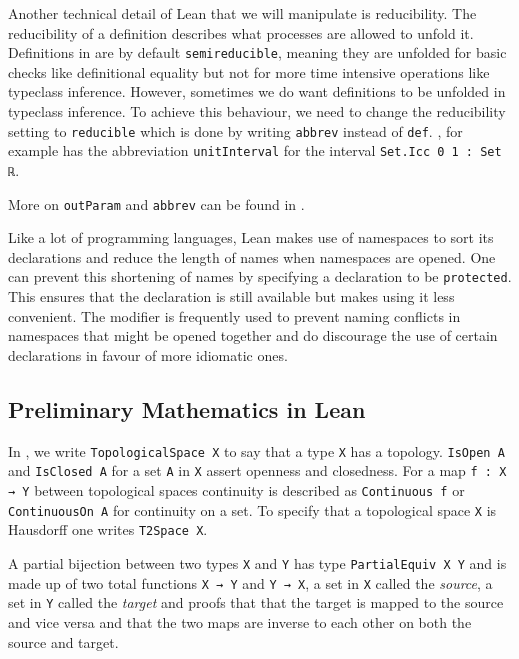Another technical detail of Lean that we will manipulate is reducibility.
The reducibility of a definition describes what processes are allowed to unfold it. 
Definitions in \mathlib are by default \lstinline|semireducible|, meaning they are unfolded for basic checks like definitional equality but not for more time intensive operations like typeclass inference.
However, sometimes we do want definitions to be unfolded in typeclass inference. 
To achieve this behaviour, we need to change the reducibility setting to \lstinline|reducible| which is done by writing \lstinline|abbrev| instead of \lstinline|def|. 
\mathlib, for example has the abbreviation \lstinline|unitInterval| for the interval \lstinline|Set.Icc 0 1 : Set ℝ|.

More on \lstinline|outParam| and \lstinline|abbrev| can be found in \cite{LeanReference2025}.

Like a lot of programming languages, Lean makes use of namespaces to sort its declarations and reduce the length of names when namespaces are opened. 
One can prevent this shortening of names by specifying a declaration to be \lstinline|protected|. 
This ensures that the declaration is still available but makes using it less convenient. 
The modifier is frequently used to prevent naming conflicts in namespaces that might be opened together and do discourage the use of certain declarations in favour of more idiomatic ones. 

\subsection{Preliminary Mathematics in Lean}\label{sub:mathinlean}

In \mathlib, we write \lstinline|TopologicalSpace X| to say that a type \lstinline|X| has a topology. 
\lstinline|IsOpen A| and \lstinline|IsClosed A| for a set \lstinline|A| in \lstinline|X| assert openness and closedness. 
For a map \lstinline|f : X → Y| between topological spaces continuity is described as \lstinline|Continuous f| or \lstinline|ContinuousOn A| for continuity on a set. 
To specify that a topological space \lstinline|X| is Hausdorff one writes \lstinline|T2Space X|.

A partial bijection between two types \lstinline|X| and \lstinline|Y| has type \lstinline|PartialEquiv X Y| and is made up of two total functions \lstinline|X → Y| and \lstinline|Y → X|, a set in \lstinline|X| called the \emph{source}, a set in \lstinline|Y| called the \emph{target} and proofs that that the target is mapped to the source and vice versa and that the two maps are inverse to each other on both the source and target.

